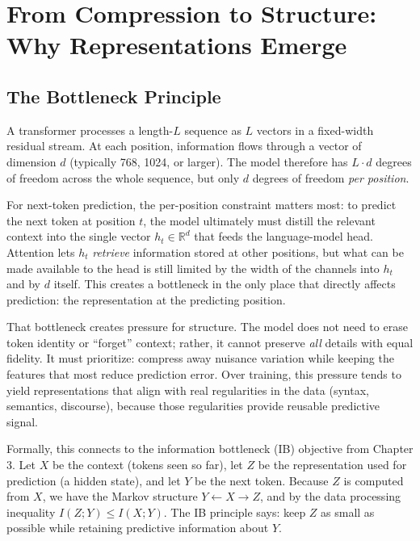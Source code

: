 \vspace{2em}

\section[From Compression to Structure]{From Compression to Structure:\\Why Representations Emerge}
\label{sec:compression_to_structure}

\vspace{1em}

\subsection{The Bottleneck Principle}

A transformer processes a length-$L$ sequence as $L$ vectors in a fixed-width residual stream. At each position, information flows through a vector of dimension $d$ (typically 768, 1024, or larger). The model therefore has $L\cdot d$ degrees of freedom across the whole sequence, but only $d$ degrees of freedom \emph{per position}.

For next-token prediction, the per-position constraint matters most: to predict the next token at position $t$, the model ultimately must distill the relevant context into the single vector $h_t \in \mathbb{R}^d$ that feeds the language-model head. Attention lets $h_t$ \emph{retrieve} information stored at other positions, but what can be made available to the head is still limited by the width of the channels into $h_t$ and by $d$ itself. This creates a bottleneck in the only place that directly affects prediction: the representation at the predicting position.

That bottleneck creates pressure for structure. The model does not need to erase token identity or ``forget'' context; rather, it cannot preserve \emph{all} details with equal fidelity. It must prioritize: compress away nuisance variation while keeping the features that most reduce prediction error. Over training, this pressure tends to yield representations that align with real regularities in the data (syntax, semantics, discourse), because those regularities provide reusable predictive signal.

\vspace{1em}

Formally, this connects to the information bottleneck (IB) objective from Chapter 3. Let $X$ be the context (tokens seen so far), let $Z$ be the representation used for prediction (a hidden state), and let $Y$ be the next token. Because $Z$ is computed from $X$, we have the Markov structure $Y \leftarrow X \rightarrow Z$, and by the data processing inequality $I(Z;Y) \le I(X;Y)$. The IB principle says: keep $Z$ as small as possible while retaining predictive information about $Y$.

